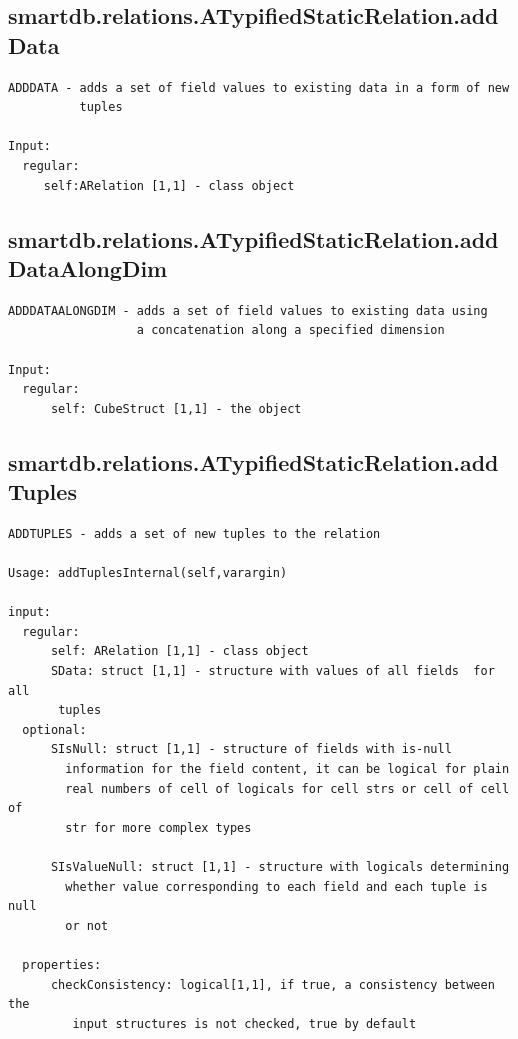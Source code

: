 \documentclass[letterpaper,10pt,english]{sphinxmanual}
\begin{document}
\subsection{smartdb.relations.ATypifiedStaticRelation.addData}
\label{chap_functions:smartdb-relations-atypifiedstaticrelation-adddata}
\begin{Verbatim}[commandchars=\\\{\}]
ADDDATA - adds a set of field values to existing data in a form of new
          tuples

Input:
  regular:
     self:ARelation [1,1] - class object
\end{Verbatim}


\subsection{smartdb.relations.ATypifiedStaticRelation.addDataAlongDim}
\label{chap_functions:smartdb-relations-atypifiedstaticrelation-adddataalongdim}
\begin{Verbatim}[commandchars=\\\{\}]
ADDDATAALONGDIM - adds a set of field values to existing data using
                  a concatenation along a specified dimension

Input:
  regular:
      self: CubeStruct [1,1] - the object
\end{Verbatim}


\subsection{smartdb.relations.ATypifiedStaticRelation.addTuples}
\label{chap_functions:smartdb-relations-atypifiedstaticrelation-addtuples}
\begin{Verbatim}[commandchars=\\\{\}]
ADDTUPLES - adds a set of new tuples to the relation

Usage: addTuplesInternal(self,varargin)

input:
  regular:
      self: ARelation [1,1] - class object
      SData: struct [1,1] - structure with values of all fields  for all
       tuples
  optional:
      SIsNull: struct [1,1] - structure of fields with is-null
        information for the field content, it can be logical for plain
        real numbers of cell of logicals for cell strs or cell of cell of
        str for more complex types

      SIsValueNull: struct [1,1] - structure with logicals determining
        whether value corresponding to each field and each tuple is null
        or not

  properties:
      checkConsistency: logical[1,1], if true, a consistency between the
         input structures is not checked, true by default
\end{Verbatim}
\end{document}
